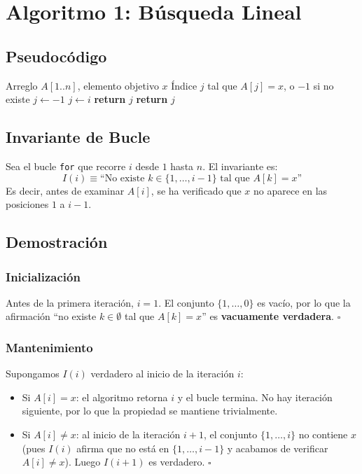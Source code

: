\documentclass[11pt,a4paper]{article}
\newcommand{\inv}{I}
\begin{document}
\newpage

\section{Algoritmo 1: Búsqueda Lineal}

\subsection{Pseudocódigo}
\begin{algorithm}[H]
\caption{Búsqueda Lineal}
\begin{algorithmic}[1]
\Require Arreglo $A[1..n]$, elemento objetivo $x$
\Ensure Índice $j$ tal que $A[j] = x$, o $-1$ si no existe
\State $j \gets -1$
        \State $j \gets i$
        \State \textbf{return} $j$
    \EndIf
\EndFor
\State \textbf{return} $j$
\end{algorithmic}
\end{algorithm}

\subsection{Invariante de Bucle}
Sea el bucle \texttt{for} que recorre $i$ desde $1$ hasta $n$. El invariante es:
\[
\boxed{\inv(i) \equiv \text{``No existe } k \in \{1, \ldots, i-1\} \text{ tal que } A[k] = x\text{''}}
\]
Es decir, antes de examinar $A[i]$, se ha verificado que $x$ no aparece en las posiciones $1$ a $i-1$.

\subsection{Demostración}

\subsubsection{Inicialización}
Antes de la primera iteración, $i = 1$. El conjunto $\{1, \ldots, 0\}$ es vacío, por lo que la afirmación ``no existe $k \in \emptyset$ tal que $A[k] = x$'' es \textbf{vacuamente verdadera}. $\square$

\subsubsection{Mantenimiento}
Supongamos $\inv(i)$ verdadero al inicio de la iteración $i$:
\begin{itemize}
    \item Si $A[i] = x$: el algoritmo retorna $i$ y el bucle termina. No hay iteración siguiente, por lo que la propiedad se mantiene trivialmente.
    \item Si $A[i] \neq x$: al inicio de la iteración $i+1$, el conjunto $\{1, \ldots, i\}$ no contiene $x$ (pues $\inv(i)$ afirma que no está en $\{1,\ldots,i-1\}$ y acabamos de verificar $A[i] \neq x$). Luego $\inv(i+1)$ es verdadero. $\square$
\end{itemize}
\end{document}
